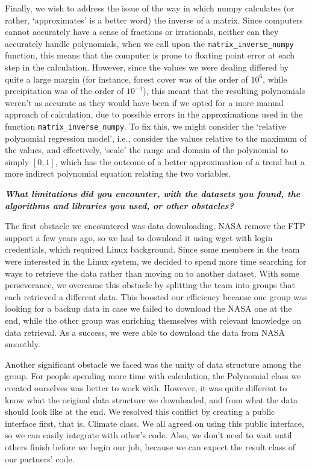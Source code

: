 \documentclass[12pt]{article}
\begin{document}
\begin{enumerate}
\begin{text}
Finally, we wish to address the issue of the way in which numpy calculates (or rather, `approximates' is a better word) the inverse of a matrix. Since computers cannot accurately have a sense of fractions or irrationals, neither can they accurately handle polynomials, when we call upon the \texttt{matrix\_inverse\_numpy} function, this means that the computer is prone to floating point error at each step in the calculation. However, since the values we were dealing differed by quite a large margin (for instance, forest cover was of the order of $10^6$, while precipitation was of the order of $10^{-1}$), this meant that the resulting polynomials weren't as accurate as they would have been if we opted for a more manual approach of calculation, due to possible errors in the approximations used in the function \texttt{matrix\_inverse\_numpy}. To fix this, we might consider the `relative polynomial regression model', i.e., consider the values relative to the maximum of the values, and effectively, `scale' the range and domain of the polynomial to simply $[0, 1]$, which has the outcome of a better approximation of a trend but a more indirect polynomial equation relating the two variables.

\emph{\textbf{What limitations did you encounter, with the datasets you found, the algorithms and libraries you used, or other obstacles?}}

The first obstacle we encountered was data downloading. NASA remove the FTP support a few years ago, so we had to download it using wget with login credentials, which required Linux background. Since some members in the team were interested in the Linux system, we decided to spend more time searching for ways to retrieve the data rather than moving on to another dataset. With some perseverance, we overcame this obstacle by splitting the team into groups that each retrieved a different data. This boosted our efficiency because one group was looking for a backup data in case we failed to download the NASA one at the end, while the other group was enriching themselves with relevant knowledge on data retrieval. As a success, we were able to download the data from NASA smoothly.

Another significant obstacle we faced was the unity of data structure among the group. For people spending more time with calculation, the Polynomial class we created ourselves was better to work with. However, it was quite different to know what the original data structure we downloaded, and from what the data should look like at the end. We resolved this conflict by creating a public interface first, that is, Climate class. We all agreed on using this public interface, so we can easily integrate with other's code. Also, we don't need to wait until others finish before we begin our job, because we can expect the result class of our partners' code.


\end{text}
\end{enumerate}
\end{document}

